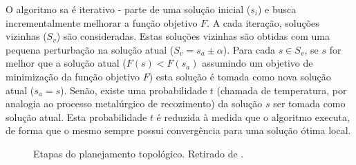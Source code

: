 O algoritmo \ac{sa} é iterativo - parte de uma solução inicial ($s_i$) e busca incrementalmente melhorar a função objetivo $F$.
A cada iteração, soluções vizinhas ($S_v$) são consideradas.
Estas soluções vizinhas são obtidas com uma pequena perturbação na solução atual ($S_v = s_a \pm \alpha$).
Para cada $s \in S_v$, se $s$ for melhor que a solução atual ($F(s) < F(s_a)$ assumindo um objetivo de minimização da função objetivo $F$) esta solução é tomada como nova solução atual ($s_a = s$).
Senão, existe uma probabilidade $t$ (chamada de temperatura, por analogia ao processo metalúrgico de recozimento) da solução $s$ ser tomada como solução atual. Esta probabilidade $t$ é reduzida à medida que o algoritmo executa, de forma que o mesmo sempre possui convergência para uma solução ótima local.

\begin{figure}[h!t]
    \centering
    
    \caption[Etapas do planejamento topológico.]{Etapas do planejamento topológico. Retirado de .}
    \label{fig:etapasPlanejamentoTopologico}
\end{figure}


